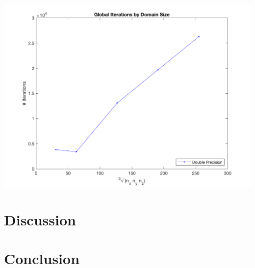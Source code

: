 \begin{center}
	\includegraphics[width = .8\textwidth]{../3dvis/iterations.png}
\end{center}
\section*{\myfont Discussion} %

\section*{\myfont Conclusion} %


